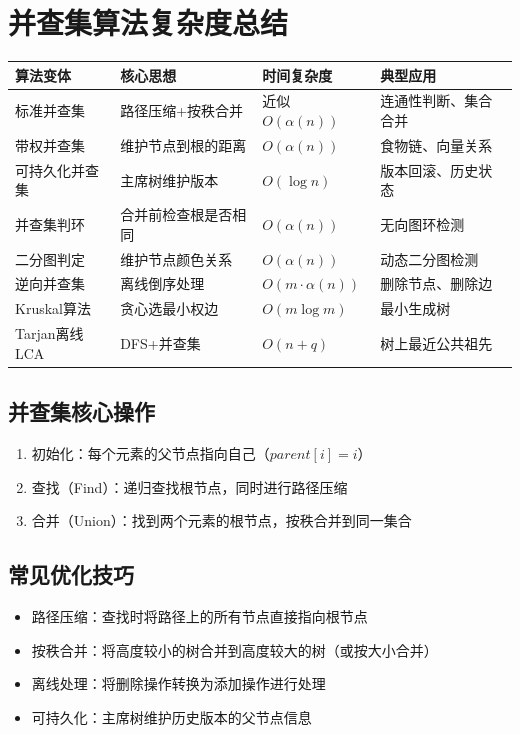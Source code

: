 \documentclass[12pt,a4paper]{ctexart}
\begin{document}
		\section{并查集算法复杂度总结}
		\begin{table}[h]
			\centering
			\begin{tabularx}{\textwidth}{|l|p{5cm}|l|X|}
				\hline
				算法变体 & 核心思想 & 时间复杂度 & 典型应用 \\
				\hline
				标准并查集 & 路径压缩+按秩合并 & 近似\(O(\alpha(n))\) & 连通性判断、集合合并 \\
				\hline
				带权并查集 & 维护节点到根的距离 & \(O(\alpha(n))\) & 食物链、向量关系 \\
				\hline
				可持久化并查集 & 主席树维护版本 & \(O(\log n)\) & 版本回滚、历史状态 \\
				\hline
				并查集判环 & 合并前检查根是否相同 & \(O(\alpha(n))\) & 无向图环检测 \\
				\hline
				二分图判定 & 维护节点颜色关系 & \(O(\alpha(n))\) & 动态二分图检测 \\
				\hline
				逆向并查集 & 离线倒序处理 & \(O(m \cdot \alpha(n))\) & 删除节点、删除边 \\
				\hline
				Kruskal算法 & 贪心选最小权边 & \(O(m \log m)\) & 最小生成树 \\
				\hline
				Tarjan离线LCA & DFS+并查集 & \(O(n + q)\) & 树上最近公共祖先 \\
				\hline
			\end{tabularx}
		\end{table}
		
		\subsection*{并查集核心操作}
		\begin{enumerate}
			\item 初始化：每个元素的父节点指向自己（\(parent[i]=i\)）
			\item 查找（Find）：递归查找根节点，同时进行路径压缩
			\item 合并（Union）：找到两个元素的根节点，按秩合并到同一集合
		\end{enumerate}
		
		\subsection*{常见优化技巧}
		\begin{itemize}
			\item 路径压缩：查找时将路径上的所有节点直接指向根节点
			\item 按秩合并：将高度较小的树合并到高度较大的树（或按大小合并）
			\item 离线处理：将删除操作转换为添加操作进行处理
			\item 可持久化：主席树维护历史版本的父节点信息
		\end{itemize}
		
\end{document}
